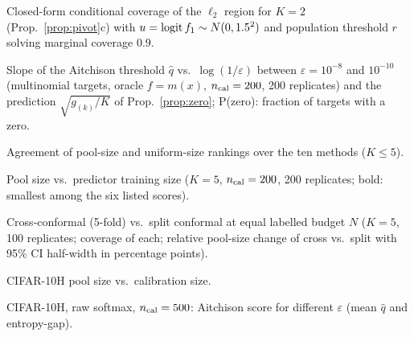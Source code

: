 \begin{table}[h]
\caption{Closed-form conditional coverage of the $\ell_2$ region for $K=2$ (Prop.~\ref{prop:pivot}c) with $u=\logit f_1\sim N(0,1.5^2)$ and population threshold $r$ solving marginal coverage $0.9$.}
\label{tab:k2gaps}
\centering\small

\end{table}

\begin{table}[h]
\caption{Slope of the Aitchison threshold $\hat q$ vs.\ $\log(1/\varepsilon)$ between $\varepsilon=10^{-8}$ and $10^{-10}$ (multinomial targets, oracle $f=m(x)$, $n_{\rm cal}=200$, 200 replicates) and the prediction $\sqrt{g_{(k)}/K}$ of Prop.~\ref{prop:zero}; P(zero): fraction of targets with a zero.}
\label{tab:zero}
\centering\small

\end{table}

\begin{table}[h]
\caption{Agreement of pool-size and uniform-size rankings over the ten methods ($K\le5$).}
\label{tab:measure}
\centering\small

\end{table}

\begin{table}[h]
\caption{Pool size vs.\ predictor training size ($K=5$, $n_{\rm cal}=200$, 200 replicates; bold: smallest among the six listed scores).}
\label{tab:predq}
\centering\small

\end{table}

\begin{table}[h]
\caption{Cross-conformal (5-fold) vs.\ split conformal at equal labelled budget $N$ ($K=5$, 100 replicates; coverage of each; relative pool-size change of cross vs.\ split with 95\% CI half-width in percentage points).}
\label{tab:cv}
\centering\small

\end{table}

\begin{table}[h]
\caption{CIFAR-10H pool size vs.\ calibration size.}
\label{tab:cifar-ncal}
\centering\small

\end{table}

\begin{table}[h]
\caption{CIFAR-10H, raw softmax, $n_{\rm cal}=500$: Aitchison score for different $\varepsilon$ (mean $\hat q$ and entropy-gap).}
\label{tab:cifar-eps}
\centering\small

\end{table}

